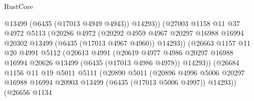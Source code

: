 \begin{lexlean}{RustCore}
\begin{coremodule}
                                  @13499
                                  (@6435 (@17013 @4949 @4943))
                                  @14293))
                              (@27003
                                @1158
                                @11
                                @37
                                @4972
                                @5113
                                (@20286
                                  @4972
                                  (@20292
                                    @4959
                                    @4967
                                    @20297
                                    @16988
                                    @16994
                                    @20302
                                    @13499
                                    (@6435 (@17013 @4967 @4960))
                                    @14293))
                                (@26663
                                  @1157
                                  @11
                                  @20
                                  @4991
                                  @5112
                                  (@20613
                                    @4991
                                    (@20619
                                      @4977
                                      @4986
                                      @20297
                                      @16988
                                      @16994
                                      @20626
                                      @13499
                                      (@6435 (@17013 @4986 @4978))
                                      @14293))
                                  (@26684
                                    @1156
                                    @11
                                    @19
                                    @5011
                                    @5111
                                    (@20890
                                      @5011
                                      (@20896
                                        @4996
                                        @5006
                                        @20297
                                        @16988
                                        @16994
                                        @20903
                                        @13499
                                        (@6435 (@17013 @5006 @4997))
                                        @14293))
                                    (@26656
                                      @1134

\end{coremodule}
\end{lexlean}
